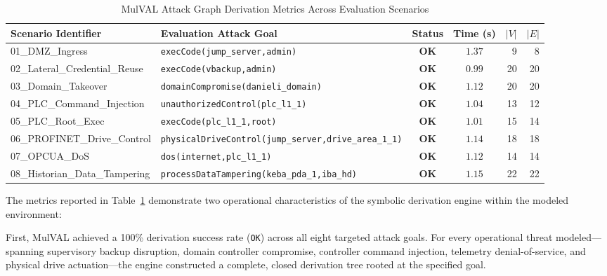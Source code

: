\documentclass[target=mst,aauheader=aics,style=]{thud}
\begin{document}
\begin{table}[htbp]
\centering
\small
\newcommand{\goaltt}[1]{{\ttfamily\raggedright\spaceskip=0.25em plus 0.25em\hyphenchar\font=`\-\relax #1}}
\caption{MulVAL Attack Graph Derivation Metrics Across Evaluation Scenarios}
\label{tab:benchmark_results}
\begin{tabularx}{\textwidth}{>{\ttfamily\footnotesize}p{4.2cm} >{\raggedright\arraybackslash\footnotesize}X c c r r}
\toprule
\textrm{\textbf{Scenario Identifier}} & \textrm{\textbf{Evaluation Attack Goal}} & \textbf{Status} & \textbf{Time (s)} & $|V|$ & $|E|$ \\
\midrule
01\_DMZ\_Ingress              & \texttt{execCode(jump\_server,admin)}                                       & \textbf{OK} & $1.37$ & 9  & 8  \\
02\_Lateral\_Credential\_Reuse& \texttt{execCode(vbackup,admin)}                                            & \textbf{OK} & $0.99$ & 20 & 20 \\
03\_Domain\_Takeover          & \texttt{domainCompromise(danieli\_domain)}                                  & \textbf{OK} & $1.12$ & 20 & 20 \\
04\_PLC\_Command\_Injection   & \texttt{unauthorizedControl(plc\_l1\_1)}                                    & \textbf{OK} & $1.04$ & 13 & 12 \\
05\_PLC\_Root\_Exec           & \texttt{execCode(plc\_l1\_1,root)}                                         & \textbf{OK} & $1.01$ & 15 & 14 \\
06\_PROFINET\_Drive\_Control  & \texttt{physicalDriveControl(}\allowbreak\texttt{jump\_server,}\allowbreak\texttt{drive\_area\_1\_1)} & \textbf{OK} & $1.14$ & 18 & 18 \\
07\_OPCUA\_DoS                & \texttt{dos(internet,plc\_l1\_1)}                                           & \textbf{OK} & $1.12$ & 14 & 14 \\
08\_Historian\_Data\_Tampering& \texttt{processDataTampering(}\allowbreak\texttt{keba\_pda\_1,}\allowbreak\texttt{iba\_hd)} & \textbf{OK} & $1.15$ & 22 & 22 \\
\bottomrule
\end{tabularx}
\end{table}

The metrics reported in Table~\ref{tab:benchmark_results} demonstrate two operational characteristics of the symbolic derivation engine within the modeled environment:

First, MulVAL achieved a 100\% derivation success rate (\texttt{OK}) across all eight targeted attack goals. For every operational threat modeled---spanning supervisory backup disruption, domain controller compromise, controller command injection, telemetry denial-of-service, and physical drive actuation---the engine constructed a complete, closed derivation tree rooted at the specified goal.
\end{document}
